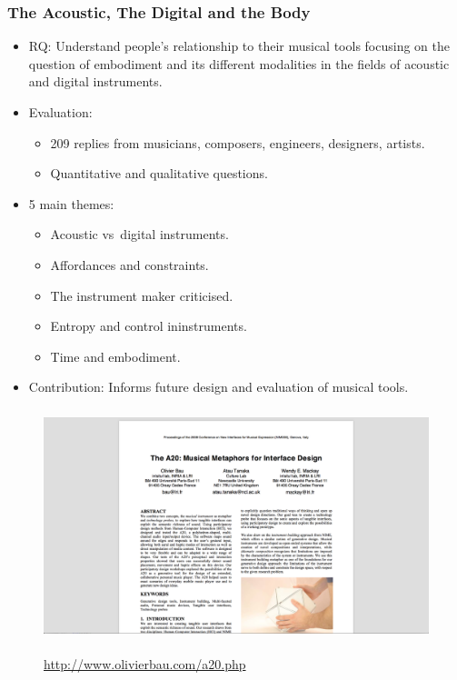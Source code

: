 \documentclass[screen, aspectratio=169]{beamer}
\begin{document}
%
\begin{frame}
\frametitle{The Acoustic, The Digital and the Body}
\begin{itemize}
\item RQ: Understand people's relationship to their musical tools focusing on the question of embodiment and its different modalities in the fields of acoustic and digital instruments.
\item Evaluation:
\begin{itemize}
\item 209 replies from musicians, composers, engineers, designers, artists.
\item Quantitative and qualitative questions.
\end{itemize}
\item 5 main themes:
\begin{itemize}
\item  Acoustic vs\ digital instruments.
\item Affordances and constraints.
\item The instrument maker criticised.
\item Entropy and control ininstruments.
\item Time and embodiment.
\end{itemize}
\item Contribution: Informs future design and evaluation of musical tools.
\end{itemize}
\end{frame}
%
\begin{frame}
\frametitle{}	
\begin{figure}
	\includegraphics[scale=0.29]{img/Bau-et-al-2008.png}\\
	    \cite{Bau.et.al.2008.NIME}\\
	       {\scriptsize  \url{http://www.olivierbau.com/a20.php}}
    \end{figure}	
\end{frame}
\end{document}
